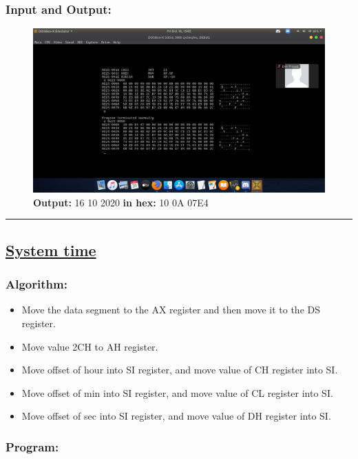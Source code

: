 \documentclass[10pt,a4paper]{article}
\begin{document}
\begin{flushleft}
\subsubsection*{\textbf{Input and Output:}}
\begin{figure}[h]
    \centering
    \includegraphics[trim = 100mm 60mm 100mm 150mm, clip, width = \textwidth]{Pics/DateIO.png}
    \caption{\textbf{Output:} 16 10 2020 \textbf{in hex:} 10 0A 07E4}
\end{figure}
\hrule
\newpage
\subsection*{\textbf{\underline{System time}}}

\subsubsection*{\textbf{Algorithm:}}
\begin{itemize}
    \item Move the data segment to the AX register and then move it to the DS register.
    \item Move value 2CH to AH register.
    \item Move offset of hour into SI register, and move value of CH register into SI.
    \item Move offset of min into SI register, and move value of CL register into SI.
    \item Move offset of sec into SI register, and move value of DH register into SI.
\end{itemize}

\newpage
\subsubsection*{\textbf{Program:}}


\end{flushleft}
\end{document}
